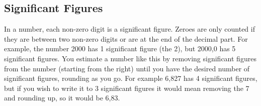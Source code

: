             \subsection*{Significant Figures}
            \nopagebreak
        \label{m30853*id64942}In a number, each non-zero digit is a significant figure. Zeroes are only counted if they are between two non-zero digits or are at the end of the decimal part. For example, the number 2000 has 1 significant figure (the 2), but 2000,0 has 5 significant figures. You estimate a number like this by removing significant figures from the number (starting from the right) until you have the desired number of significant figures, rounding as you go. For example 6,827 has 4 significant figures, but if you wish to write it to 3 significant figures it would mean removing the 7 and rounding up, so it would be 6,83.\par 
\label{m30853*secfhsst!!!underscore!!!id669}
